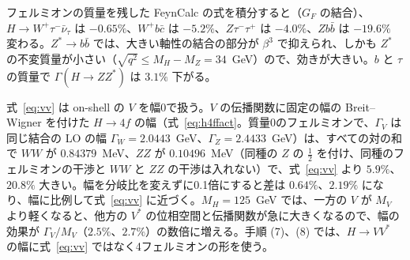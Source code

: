 \documentclass[a4paper,10pt]{ltjsarticle}
\begin{document}
フェルミオンの質量を残した FeynCalc の式を積分すると（$G_F$ の結合）、$H\to W^+\tau^-\bar\nu_\tau$ は $-0.65\%$、$W^+b\bar c$ は $-5.2\%$、$Z\tau^-\tau^+$ は $-4.0\%$、$Zb\bar b$ は $-19.6\%$ 変わる。$Z^*\to b\bar b$ では、大きい軸性の結合の部分が $\beta^3$ で抑えられ、しかも $Z^*$ の不変質量が小さい（$\sqrt{q^2}\le M_H-M_Z=34$~GeV）ので、効きが大きい。$b$ と $\tau$ の質量で $\Gamma(H\to ZZ^*)$ は $3.1\%$ 下がる。

式~\eqref{eq:vv} は on-shell の $V$ を幅0で扱う。$V$ の伝播関数に固定の幅の Breit--Wigner を付けた $H\to4f$ の幅（式~\eqref{eq:h4ffact}。質量0のフェルミオンで、$\Gamma_V$ は同じ結合の LO の幅 $\Gamma_W=2.0443$~GeV、$\Gamma_Z=2.4433$~GeV）は、すべての対の和で $WW$ が $0.84379$~MeV、$ZZ$ が $0.10496$~MeV（同種の $Z$ の $\frac12$ を付け、同種のフェルミオンの干渉と $WW$ と $ZZ$ の干渉は入れない）で、式~\eqref{eq:vv} より $5.9\%$、$20.8\%$ 大きい。幅を分岐比を変えずに0.1倍にすると差は $0.64\%$、$2.19\%$ になり、幅に比例して式~\eqref{eq:vv} に近づく。$M_H=125$~GeV では、一方の $V$ が $M_V$ より軽くなると、他方の $V^*$ の位相空間と伝播関数が急に大きくなるので、幅の効果が $\Gamma_V/M_V$（$2.5\%$、$2.7\%$）の数倍に増える。手順 (7)、(8) では、$H\to VV^*$ の幅に式~\eqref{eq:vv} ではなく4フェルミオンの形を使う。
\end{document}
